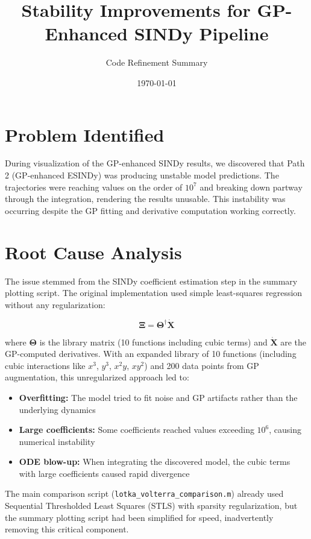 \documentclass[11pt]{article}
\title{Stability Improvements for GP-Enhanced SINDy Pipeline}
\author{Code Refinement Summary}
\date{\today}
\begin{document}
\maketitle

\section{Problem Identified}

During visualization of the GP-enhanced SINDy results, we discovered that Path 2 (GP-enhanced ESINDy) was producing unstable model predictions. The trajectories were reaching values on the order of $10^7$ and breaking down partway through the integration, rendering the results unusable. This instability was occurring despite the GP fitting and derivative computation working correctly.

\section{Root Cause Analysis}

The issue stemmed from the SINDy coefficient estimation step in the summary plotting script. The original implementation used simple least-squares regression without any regularization:

\begin{equation}
\boldsymbol{\Xi} = \boldsymbol{\Theta}^\dagger \dot{\mathbf{X}}
\end{equation}

where $\boldsymbol{\Theta}$ is the library matrix (10 functions including cubic terms) and $\dot{\mathbf{X}}$ are the GP-computed derivatives. With an expanded library of 10 functions (including cubic interactions like $x^3$, $y^3$, $x^2y$, $xy^2$) and 200 data points from GP augmentation, this unregularized approach led to:

\begin{itemize}
    \item \textbf{Overfitting:} The model tried to fit noise and GP artifacts rather than the underlying dynamics
    \item \textbf{Large coefficients:} Some coefficients reached values exceeding $10^6$, causing numerical instability
    \item \textbf{ODE blow-up:} When integrating the discovered model, the cubic terms with large coefficients caused rapid divergence
\end{itemize}

The main comparison script (\texttt{lotka\_volterra\_comparison.m}) already used Sequential Thresholded Least Squares (STLS) with sparsity regularization, but the summary plotting script had been simplified for speed, inadvertently removing this critical component.
\end{document}
